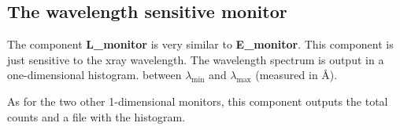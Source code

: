 \subsection*{The wavelength sensitive monitor}
\label{s:L_monitor}
The component \textbf{L\_monitor} is very similar to
\textbf{E\_monitor}.
This component is just sensitive to the xray wavelength.
The wavelength spectrum is output in a one-dimensional histogram.
between $\lambda_\mathrm{min}$ and $\lambda_\mathrm{max}$ (measured in \AA ).

As for the two other 1-dimensional monitors, this component outputs
the total counts and a file with the histogram.

